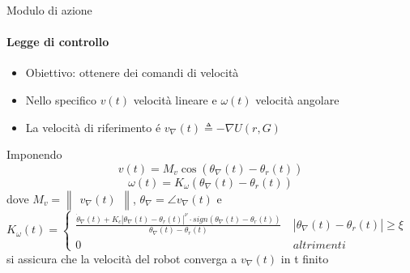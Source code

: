 \documentclass[handout]{beamer}
\begin{document}
\begin{frame}{Modulo di azione}
\framesubtitle{Legge di controllo}
\begin{itemize}
\item Obiettivo: ottenere dei comandi di velocità 
\item Nello specifico $v(t)$ velocità lineare e $\omega(t)$ velocità angolare
\item La velocità di riferimento é $v_{\nabla}(t) \triangleq -\nabla U(r,G)$
\end{itemize}
\vspace{5mm}
Imponendo
\begin{equation}
v(t) = M_v \cos(\theta_{\nabla}(t) - \theta_r(t))
\end{equation}
\begin{equation}
\omega(t) = K_{\omega}(\theta_{\nabla}(t) - \theta_r(t))
\end{equation}
dove \(M_v=\begin{Vmatrix}v_{\nabla}(t)\end{Vmatrix}\), \(\theta_{\nabla}=\angle v_{\nabla}(t)\) e \\ \vspace*{1mm}
${K_{\omega}(t)= \begin{cases}
\frac{\dot{\theta}_{\nabla}(t) + K_c|\theta_{\nabla}(t)-\theta_r(t)|^{\nu} \cdot sign(\theta_{\nabla}(t) - \theta_r(t))}{\theta_{\nabla}(t) - \theta_r(t)} \ &|\theta_{\nabla}(t)-\theta_r(t)| \geq \xi \\
0 \ &altrimenti
\end{cases}}$ \\
\vspace*{3mm}
si assicura che la velocità del robot converga a $v_{\nabla}(t)$ in t finito
\end{frame}
\end{document}
